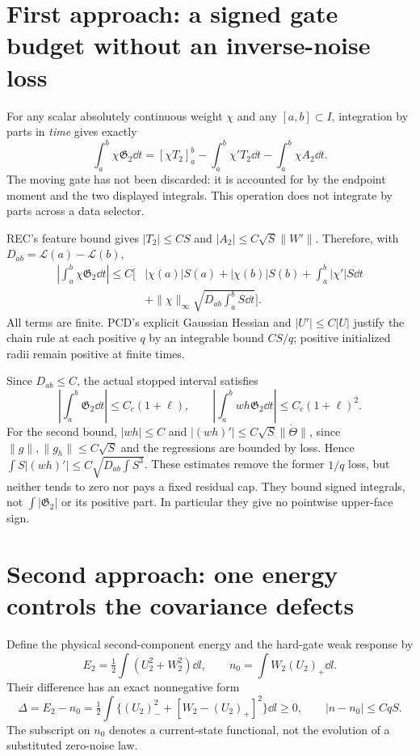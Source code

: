 \documentclass[11pt]{article}
\begin{document}
\section{First approach: a signed gate budget without an inverse-noise loss}
For any scalar absolutely continuous weight $\chi$ and any
$[a,b]\subset I$, integration by parts in \emph{time} gives exactly
\begin{equation}\label{an04gtmv1:ibp}
 \int_a^b\chi\mathfrak G_2\dd t
 =[\chi T_2]_a^b-\int_a^b\chi'T_2\dd t-\int_a^b\chi A_2\dd t.
\end{equation}
The moving gate has not been discarded: it is accounted for by the
endpoint moment and the two displayed integrals. This operation
does not integrate by parts across a data selector.

REC's feature bound gives $|T_2|\le CS$ and
$|A_2|\le C\sqrt S\|W'\|$. Therefore, with
$D_{ab}=\mathcal L(a)-\mathcal L(b)$,
\begin{align}
 \left|\int_a^b\chi\mathfrak G_2\dd t\right|
 \le C\bigg[&|\chi(a)|S(a)+|\chi(b)|S(b)+\int_a^b|\chi'|S\dd t\nonumber\\
 &+\|\chi\|_\infty\sqrt{D_{ab}\int_a^bS\dd t}\bigg].
 \label{an04gtmv1:signedbudget}
\end{align}
All terms are finite. PCD's explicit Gaussian Hessian and
$|U'|\le C|U|$ justify the chain rule at each positive $q$ by
an integrable bound $CS/q$; positive initialized radii remain
positive at finite times.

Since $D_{ab}\le C$, the actual stopped interval satisfies
\begin{equation}\label{an04gtmv1:gatebounds}
 \left|\int_a^b\mathfrak G_2\dd t\right|\le C_c(1+\ell),
 \qquad
 \left|\int_a^b wh\mathfrak G_2\dd t\right|\le C_c(1+\ell)^2.
\end{equation}
For the second bound, $|wh|\le C$ and
$|(wh)'|\le C\sqrt S\|\dot\Theta\|$, since
$\|g\|,\|g_h\|\le C\sqrt S$ and the regressions are bounded
by loss. Hence $\int S|(wh)'|\le C\sqrt{D_{ab}\int S^3}$.
These estimates remove the former $1/q$ loss, but neither tends
to zero nor pays a fixed residual cap. They bound signed integrals,
not $\int|\mathfrak G_2|$ or its positive part. In particular
they give no pointwise upper-face sign.

\section{Second approach: one energy controls the covariance defects}
Define the physical second-component energy and the hard-gate
weak response by
\[
 E_2=\tfrac12\int(U_2^2+W_2^2)\dd l,\qquad
 n_0=\int W_2(U_2)_+\dd l.
\]
Their difference has an exact nonnegative form
\begin{equation}\label{an04gtmv1:defect}
 \Delta=E_2-n_0
 =\tfrac12\int\{(U_2)_-^2+[W_2-(U_2)_+]^2\}\dd l\ge0,
 \qquad |n-n_0|\le CqS.
\end{equation}
The subscript on $n_0$ denotes a current-state functional, not
the evolution of a substituted zero-noise law.
\end{document}
